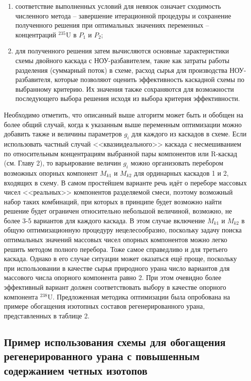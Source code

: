\begin{enumerate}
    \item соответствие выполненных условий для невязок означает сходимость численного метода -- завершение итерационной процедуры и сохранение полученного решения при оптимальных значениях переменных -- концентраций $^{235}$U в $P_1$ и $P_2$;
    \item для полученного решения затем вычисляются основные характеристики схемы двойного каскада с НОУ-разбавителем, такие как затраты работы разделения (суммарный поток) в схеме, расход сырья для производства НОУ-разбавителя, которые позволяют оценить эффективность каскадной схемы по выбранному критерию. Их значения также сохраняются для возможности последующего выбора решения исходя из выбора критерия эффективности.
\end{enumerate}

Необходимо отметить, что описанный выше алгоритм может быть и обобщен на более общий случай, когда к указанным выше переменным оптимизации можно добавить также и величины параметров $g_{i}$ для каждого из каскадов в схеме.  Если использовать частный случай <<квазиидеального>> каскада с несмешиванием по относительным концентрациям выбранной пары компонентов или R-каскад (см. Главу 2), то варьирование величин $g_{i}$ можно организовать перебором возможных опорных компонент $M_{k1}$ и $M_{k2}$ для ординарных каскадов 1 и 2, входящих в схему. В самом простейшем варианте речь идёт о переборе массовых чисел <<реальных>> компонентов разделяемой смеси, поэтому возможный набор таких комбинаций, при которых в принципе будет возможно найти решение будет ограничен относительно небольшой величиной, возможно, не более 3-5 вариантов для каждого каскада. В этом случае включение $M_{k1}$ и $M_{k2}$ в общую оптимизационную процедуру нецелесообразно, поскольку задачу поиска оптимальных значений массовых чисел опорных компонентов можно легко решить методом полного перебора. Тоже самое справедливо и для третьего каскада. Однако в его случае ситуации может оказаться ещё проще, поскольку при использовании в качестве сырья природного урана число вариантов для массового числа опорного компонента равно 2. При этом очевидно более эффективный вариант должен соответствовать выбору в качестве опорного компонента $^{238}$U.
Предложенная методика оптимизации была опробована на примере обогащения изотопных составов регенерированного урана, представленных в таблице 2.


\subsection{Пример использования схемы для обогащения регенерированного урана с повышенным содержанием четных изотопов}

